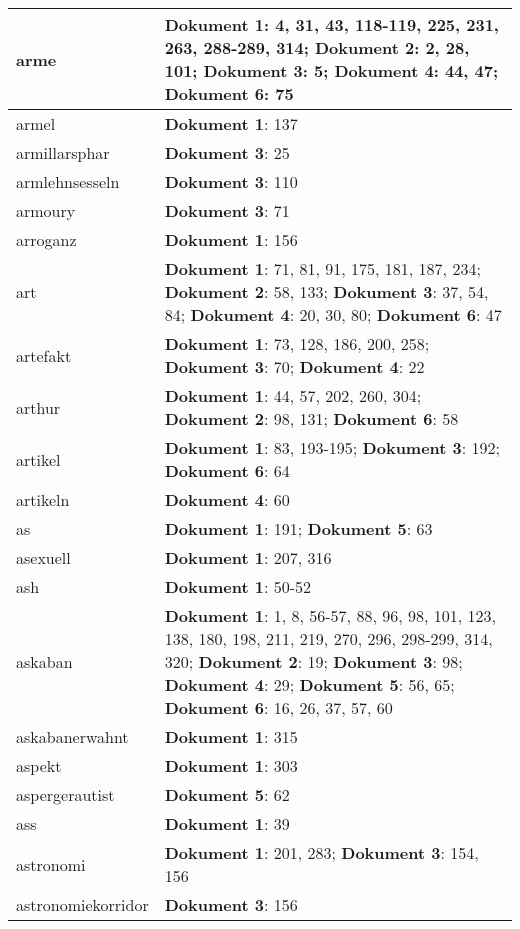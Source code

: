 \documentclass[a5paper]{article}
\begin{document}
\begin{longtable}[l]{|l|p{3in}|}
arme & \textbf{Dokument 1}: 4, 31, 43, 118-119, 225, 231, 263, 288-289, 314; \textbf{Dokument 2}: 2, 28, 101; \textbf{Dokument 3}: 5; \textbf{Dokument 4}: 44, 47; \textbf{Dokument 6}: 75 \\
\hline
armel & \textbf{Dokument 1}: 137 \\
\hline
armillarsphar & \textbf{Dokument 3}: 25 \\
\hline
armlehnsesseln & \textbf{Dokument 3}: 110 \\
\hline
armoury & \textbf{Dokument 3}: 71 \\
\hline
arroganz & \textbf{Dokument 1}: 156 \\
\hline
art & \textbf{Dokument 1}: 71, 81, 91, 175, 181, 187, 234; \textbf{Dokument 2}: 58, 133; \textbf{Dokument 3}: 37, 54, 84; \textbf{Dokument 4}: 20, 30, 80; \textbf{Dokument 6}: 47 \\
\hline
artefakt & \textbf{Dokument 1}: 73, 128, 186, 200, 258; \textbf{Dokument 3}: 70; \textbf{Dokument 4}: 22 \\
\hline
arthur & \textbf{Dokument 1}: 44, 57, 202, 260, 304; \textbf{Dokument 2}: 98, 131; \textbf{Dokument 6}: 58 \\
\hline
artikel & \textbf{Dokument 1}: 83, 193-195; \textbf{Dokument 3}: 192; \textbf{Dokument 6}: 64 \\
\hline
artikeln & \textbf{Dokument 4}: 60 \\
\hline
as & \textbf{Dokument 1}: 191; \textbf{Dokument 5}: 63 \\
\hline
asexuell & \textbf{Dokument 1}: 207, 316 \\
\hline
ash & \textbf{Dokument 1}: 50-52 \\
\hline
askaban & \textbf{Dokument 1}: 1, 8, 56-57, 88, 96, 98, 101, 123, 138, 180, 198, 211, 219, 270, 296, 298-299, 314, 320; \textbf{Dokument 2}: 19; \textbf{Dokument 3}: 98; \textbf{Dokument 4}: 29; \textbf{Dokument 5}: 56, 65; \textbf{Dokument 6}: 16, 26, 37, 57, 60 \\
\hline
askabanerwahnt & \textbf{Dokument 1}: 315 \\
\hline
aspekt & \textbf{Dokument 1}: 303 \\
\hline
aspergerautist & \textbf{Dokument 5}: 62 \\
\hline
ass & \textbf{Dokument 1}: 39 \\
\hline
astronomi & \textbf{Dokument 1}: 201, 283; \textbf{Dokument 3}: 154, 156 \\
\hline
astronomiekorridor & \textbf{Dokument 3}: 156 \\
\hline

\end{longtable}
\end{document}
